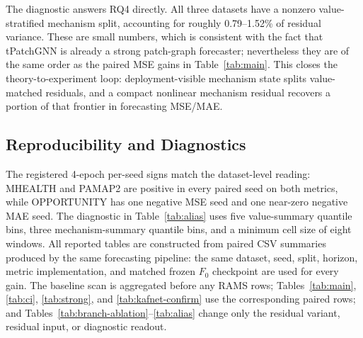 ﻿\documentclass[10pt,conference]{IEEEtran}
\newcommand{\method}{\textnormal{\mbox{RAMS}}}
\newcommand{\baseT}{\textnormal{\mbox{tPatchGNN}}}
\begin{document}
\begin{table}[H]
\centering
\caption{Mechanism-state aliasing diagnostic.  After value matching,
mechanism bins explain nonzero residual variation.}
\label{tab:alias}
\small
{}
\end{table}

The diagnostic answers RQ4 directly.  All three datasets have a nonzero
value-stratified mechanism split, accounting for roughly 0.79--1.52\% of
residual variance.  These are small numbers, which is consistent with the
fact that \baseT{} is already a strong patch-graph forecaster; nevertheless
they are of the same order as the paired MSE gains in
Table~\ref{tab:main}.  This closes the theory-to-experiment loop:
deployment-visible mechanism state splits value-matched residuals, and a
compact nonlinear mechanism residual recovers a portion of that frontier in
forecasting MSE/MAE.

\subsection{Reproducibility and Diagnostics}

The registered 4-epoch per-seed signs match the dataset-level reading:
MHEALTH and PAMAP2 are positive in every paired seed on both metrics, while
OPPORTUNITY has one negative MSE seed and one near-zero negative MAE seed.  The
diagnostic in Table~\ref{tab:alias} uses five value-summary quantile bins,
three mechanism-summary quantile bins, and a minimum cell size of eight
windows.  All reported tables are constructed from paired CSV summaries
produced by the same forecasting pipeline: the same dataset, seed, split,
horizon, metric implementation, and matched frozen \(F_0\) checkpoint are used
for every gain.  The baseline scan is aggregated before any \method{} rows;
Tables~\ref{tab:main}, \ref{tab:ci}, \ref{tab:strong}, and
\ref{tab:kafnet-confirm} use the corresponding paired rows; and
Tables~\ref{tab:branch-ablation}--\ref{tab:alias} change only the residual
variant, residual input, or diagnostic readout.
\end{document}
